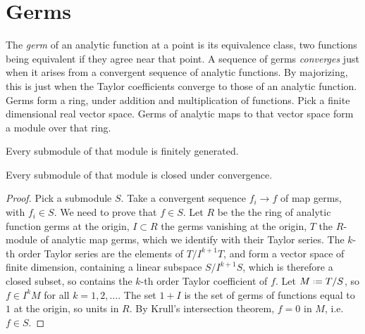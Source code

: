 \section{Germs}
The \emph{germ} of an analytic function at a point is its equivalence class, two functions being equivalent if they agree near that point.
A sequence of germs \emph{converges} just when it arises from a convergent sequence of analytic functions.
By majorizing, this is just when the Taylor coefficients converge to those of an analytic function.
Germs form a ring, under addition and multiplication of functions.
Pick a finite dimensional real vector space.
Germs of analytic maps to that vector space form a module over that ring.
\begin{theorem}\label{theorem:Hilbert.basis} Every submodule of that module is finitely generated.
\end{theorem}
\begin{theorem}\label{theorem:germ.convergence}
Every submodule of that module is closed under convergence.
\end{theorem}
\begin{proof}
Pick a submodule \(S\).
Take a convergent sequence \(f_i\to f\) of map germs, with \(f_i\in S\).
We need to prove that \(f\in S\).
Let \(R\) be the the ring of analytic function germs at the origin, \(I\subset R\) the germs vanishing at the origin, \(T\) the \(R\)-module of analytic map germs, which we identify with their Taylor series.
The \(k\)-th order Taylor series are the elements of \(T/I^{k+1}T\), and form a vector space of finite dimension, containing a linear subspace \(S/I^{k+1}S\), which is therefore a closed subset, so contains the \(k\)-th order Taylor coefficient of \(f\).
Let \(M\defeq T/S\), so \(f\in I^kM\) for all \(k=1,2,\dots\).
The set \(1+I\) is the set of germs of functions equal to \(1\) at the origin, so units in \(R\).
By Krull's intersection theorem, \(f=0\) in \(M\), i.e. \(f\in S\).
\end{proof}
